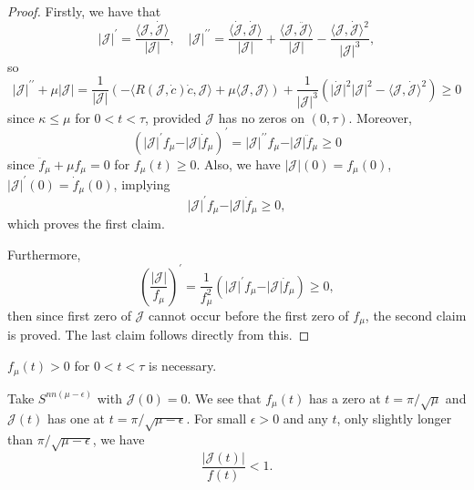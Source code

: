 \begin{proof}
	Firstly, we have that
	\[
		\vert \mathcal{J}  \vert ^{\prime} = \frac{\langle \mathcal{J} , \dot{\mathcal{J} }  \rangle }{\vert \mathcal{J}  \vert },\quad
		\vert \mathcal{J}  \vert ^{\prime\prime} = \frac{\langle \dot{\mathcal{J} } , \dot{\mathcal{J} } \rangle }{\vert \mathcal{J}  \vert } + \frac{\langle \mathcal{J} , \ddot{\mathcal{J} }  \rangle }{\vert \mathcal{J}  \vert } - \frac{\langle \mathcal{J} , \dot{\mathcal{J} }  \rangle ^2}{\vert \mathcal{J} \vert^3 },
	\]
	so
	\[
		\vert \mathcal{J}  \vert ^{\prime\prime} + \mu \vert \mathcal{J} \vert
		= \frac{1}{\vert \mathcal{J} \vert } \left( - \langle R(\mathcal{J} , \dot{c} ) \dot{c}, \mathcal{J} \rangle + \mu \langle \mathcal{J} , \mathcal{J}  \rangle  \right) + \frac{1}{\vert \mathcal{J}  \vert ^3} \left( \vert \dot{\mathcal{J} } \vert^2 \vert \mathcal{J}  \vert ^2 - \langle \mathcal{J} , \dot{\mathcal{J} } \rangle ^2 \right) \geq 0
	\]
	since \(\kappa \leq \mu \) for \(0 < t < \tau \), provided \(\mathcal{J} \) has no zeros on \((0, \tau )\). Moreover,
	\[
		\left( \vert \mathcal{J}  \vert ^{\prime} f_\mu - \vert \mathcal{J}  \vert \dot{f} _\mu  \right) ^{\prime}
		= \vert \mathcal{J}  \vert ^{\prime\prime} f_\mu - \vert \mathcal{J}  \vert \ddot{f}_\mu \geq 0
	\]
	since \(\ddot{f}_\mu + \mu f_\mu = 0\) for \(f_\mu (t) \geq 0\). Also, we have \(\vert \mathcal{J}  \vert (0) = f_\mu (0)\), \(\vert \mathcal{J}  \vert ^{\prime} (0) = \dot{f} _\mu (0)\), implying
	\[
		\vert \mathcal{J}  \vert ^{\prime} f_\mu - \vert \mathcal{J}  \vert \dot{f} _\mu \geq 0,
	\]
	which proves the first claim.

	Furthermore,
	\[
		\left( \frac{\vert \mathcal{J}  \vert }{f_\mu } \right) ^{\prime} = \frac{1}{f^2_\mu } \left( \vert \mathcal{J}  \vert ^{\prime} f_\mu - \vert \mathcal{J}  \vert \dot{f} _\mu  \right) \geq 0,
	\]
	then since first zero of \(\mathcal{J}\) cannot occur before the first zero of \(f_\mu \), the second claim is proved. The last claim follows directly from this.
\end{proof}

\begin{remark}
	\(f_\mu (t) > 0\) for \(0 < t < \tau \) is necessary.
\end{remark}
\begin{explanation}
	Take \(S^{nn(\mu - \epsilon )} \) with \(\mathcal{J} (0) = 0\). We see that \(f_\mu (t)\) has a zero at \(t = \pi / \sqrt{\mu } \) and \(\mathcal{J} (t)\) has one at \(t = \pi / \sqrt{\mu - \epsilon } \). For small \(\epsilon > 0\) and any \(t\), only slightly longer than \(\pi / \sqrt{\mu - \epsilon } \), we have
	\[
		\frac{\vert \mathcal{J} (t) \vert }{f(t)} < 1.
	\]
\end{explanation}


